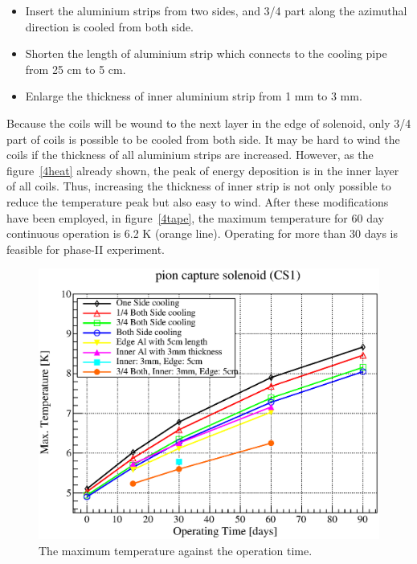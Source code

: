 \begin{itemize}
 \setlength{\itemsep}{-5pt}
 \item Insert the aluminium strips from two sides, and 3/4 part along the azimuthal direction is cooled from both side.
 \item Shorten the length of aluminium strip which connects to the cooling pipe from 25 cm to 5 cm.
 \item Enlarge the thickness of inner aluminium strip from 1 mm to 3 mm. 
\end{itemize}
Because the coils will be wound to the next layer in the edge of solenoid, only 3/4 part of coils is possible to be cooled from both side.
It may be hard to wind the coils if the thickness of all aluminium strips are increased.
However, as the figure~\ref{4heat} already shown, the peak of energy deposition is in the inner layer of all coils.
Thus, increasing the thickness of inner strip is not only possible to reduce the temperature peak but also easy to wind.
After these modifications have been employed, in figure~\ref{4tape}, the maximum temperature for 60 day continuous operation is 6.2 K (orange line).
Operating for more than 30 days is feasible for phase-II experiment.
  \begin{figure}[H]
   \centering
   \includegraphics[scale=0.45]{chapter5/fig/maxtemp.eps}
   \caption{ The maximum temperature against the operation time.}
   \label{4maxtemp}
  \end{figure}

